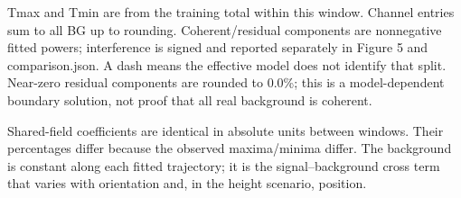 \documentclass[10pt,a4paper]{article}
\begin{document}
Tmax and Tmin are from the training total within this window. Channel entries sum to all BG up to rounding. Coherent/residual components are nonnegative fitted powers; interference is signed and reported separately in Figure 5 and comparison.json. A dash means the effective model does not identify that split. Near-zero residual components are rounded to 0.0\%; this is a model-dependent boundary solution, not proof that all real background is coherent.\par
Shared-field coefficients are identical in absolute units between windows. Their percentages differ because the observed maxima/minima differ. The background is constant along each fitted trajectory; it is the signal–background cross term that varies with orientation and, in the height scenario, position.\par
\end{document}
